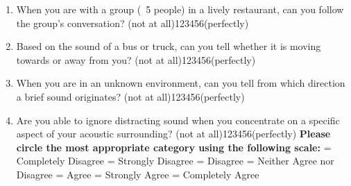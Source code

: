 \documentclass[12pt, a4paper]{article}
\begin{document}
\begin{enumerate}
\item  When you are with a group (~5 people) in a lively restaurant, can you follow the group's conversation?
\newline (not at all)\hspace{12pt}1\hspace{12pt}2\hspace{12pt}3\hspace{12pt}4\hspace{12pt}5\hspace{12pt}6\hspace{12pt}(perfectly)
\item  Based on the sound of a bus or truck, can you tell whether it is moving towards or away from you?
\newline (not at all)\hspace{12pt}1\hspace{12pt}2\hspace{12pt}3\hspace{12pt}4\hspace{12pt}5\hspace{12pt}6\hspace{12pt}(perfectly)
\item  When you are in an unknown environment, can you tell from which direction a brief sound originates?
\newline (not at all)\hspace{12pt}1\hspace{12pt}2\hspace{12pt}3\hspace{12pt}4\hspace{12pt}5\hspace{12pt}6\hspace{12pt}(perfectly)
\item Are you able to ignore distracting sound when you concentrate on a specific aspect of your acoustic surrounding?
\newline (not at all)\hspace{12pt}1\hspace{12pt}2\hspace{12pt}3\hspace{12pt}4\hspace{12pt}5\hspace{12pt}6\hspace{12pt}(perfectly)
\newpage
\textbf{Please circle the most appropriate category using the following scale:}
 = Completely Disagree
 = Strongly Disagree
 = Disagree
 = Neither Agree nor Disagree
 = Agree
 = Strongly Agree
 = Completely Agree


\end{enumerate}
\end{document}
